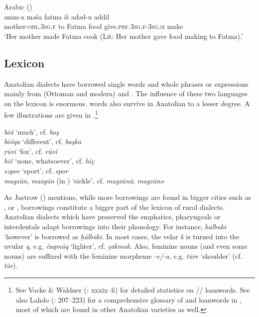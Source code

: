\documentclass[output=paper]{langsci/langscibook}
\begin{document}
\begin{exe}
\ex \label{persa}
 Arabic (\citealt[221]{Taylan2017})\\
\gll  	əmm-a mə\v{s}a fatma \v{s}i adəd-u    	addil	\\
  mother-\textsc{obl.3sg.f} to Fatma food      give.\textsc{prf.3sg.f-3sg.m}	make	 \\
        \glt `Her mother made Fatma cook (Lit: Her mother gave food making to Fatma).'
\end{exe}



\subsection{Lexicon}

Anatolian  dialects have borrowed single words and whole phrases or expressions mainly from (Ottoman and modern)  and . The influence of these two languages on the  lexicon is enormous.  words also survive in Anatolian  to a lesser degree. A few illustrations are given in .\footnote{See Vocke \& Waldner (\citeyear{VockeWaldner1982}: xxxix--li) for detailed statistics on // {loanwords}. See also Lahdo (\citeyear{Lahdo2009}: 207--223) for a comprehensive glossary of  and  {loanwords} in  , most of which are found in other Anatolian  varieties as well.}


\ea \label{lex}
\noindent \textit{b\={o}\v{s}} `much', cf.  \textit{bo\c{s}}\\
\textit{b\={o}\v{s}qa} `different', cf.  \textit{ba\c{s}ka}\\
\textit{\d{r}\={u}vi} `fox', cf.  \textit{rûvî}\\
\textit{hi\v{c}} `none, whatsoever', cf.  \textit{hī\c{c}}\\
\textit{səpor} `sport', cf.  \textit{spor}\\
\textit{magz\={u}n}, \textit{mazg\={u}n} (in ) `sickle', cf.  \textit{magz\={u}n\={a}};  \textit{magz\={u}no}\\
\z

\noindent As Jastrow (\citeyear[95]{Jastrow2011anatolian}) mentions, while more  borrowings are found in bigger cities such as ,  or ,  borrowings constitute a bigger part of the lexicon of rural dialects. Anatolian  dialects which have preserved the emphatics, {pharyngeals} or interdentals adapt borrowings into their phonology. For instance,  \textit{halbuki} `however' is borrowed as \textit{\d{h}\={a}lb\={u}ki}. In most cases, the velar \textit{k} is turned into the uvular \textit{q}, e.g. \textit{\v{c}aqm\={a}q} `lighter', cf.  \textit{\c{c}akmak}. Also,  feminine nouns (and even some  nouns) are suffixed with the  feminine morpheme \textit{-e/-a}, e.g. \textit{t\={u}re} `shoulder' (cf.  \textit{t\^{u}r}).
\end{document}
